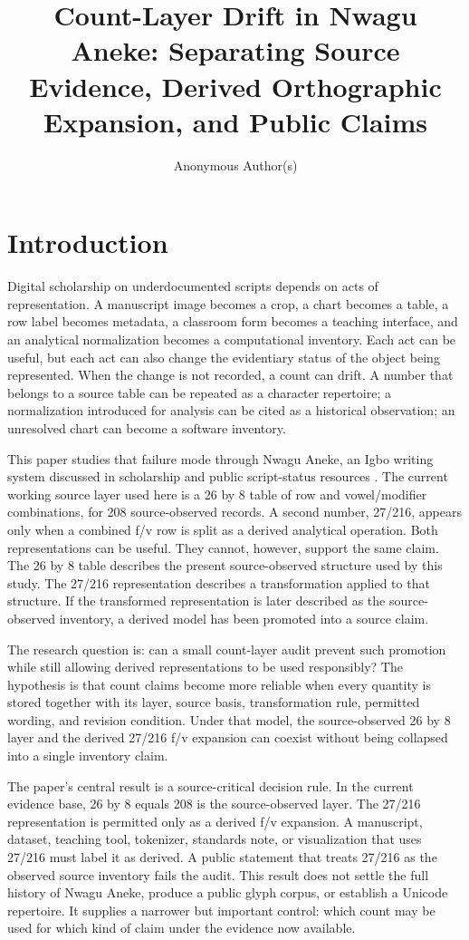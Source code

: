 \documentclass[sigconf,nonacm]{acmart}
\title{Count-Layer Drift in Nwagu Aneke: Separating Source Evidence, Derived Orthographic Expansion, and Public Claims}
\author{Anonymous Author(s)}
\affiliation{\institution{Independent research manuscript}\country{Nigeria}}
\begin{document}
\maketitle

\section{Introduction}
Digital scholarship on underdocumented scripts depends on acts of
representation. A manuscript image becomes a crop, a chart becomes a table, a
row label becomes metadata, a classroom form becomes a teaching interface, and
an analytical normalization becomes a computational inventory. Each act can be
useful, but each act can also change the evidentiary status of the object being
represented. When the change is not recorded, a count can drift. A number that
belongs to a source table can be repeated as a character repertoire; a
normalization introduced for analysis can be cited as a historical observation;
an unresolved chart can become a software inventory.

This paper studies that failure mode through Nwagu Aneke, an Igbo writing
system discussed in scholarship and public script-status resources
\cite{azuonye1992,omniglotNwagu,scriptSourceNwagu,sirisNwaguProposal}. The
current working source layer used here is a 26 by 8 table of row and
vowel/modifier combinations, for 208 source-observed records. A second number,
27/216, appears only when a combined f/v row is split as a derived analytical
operation. Both representations can be useful. They cannot, however, support the
same claim. The 26 by 8 table describes the present source-observed structure
used by this study. The 27/216 representation describes a transformation applied
to that structure. If the transformed representation is later described as the
source-observed inventory, a derived model has been promoted into a source
claim.

The research question is: can a small count-layer audit prevent such promotion
while still allowing derived representations to be used responsibly? The
hypothesis is that count claims become more reliable when every quantity is
stored together with its layer, source basis, transformation rule, permitted
wording, and revision condition. Under that model, the source-observed
26 by 8 layer and the derived 27/216 f/v expansion can coexist without being
collapsed into a single inventory claim.

The paper's central result is a source-critical decision rule. In the current
evidence base, 26 by 8 equals 208 is the source-observed layer. The 27/216
representation is permitted only as a derived f/v expansion. A manuscript,
dataset, teaching tool, tokenizer, standards note, or visualization that uses
27/216 must label it as derived. A public statement that treats 27/216 as the
observed source inventory fails the audit. This result does not settle the full
history of Nwagu Aneke, produce a public glyph corpus, or establish a Unicode
repertoire. It supplies a narrower but important control: which count may be
used for which kind of claim under the evidence now available.
\end{document}
